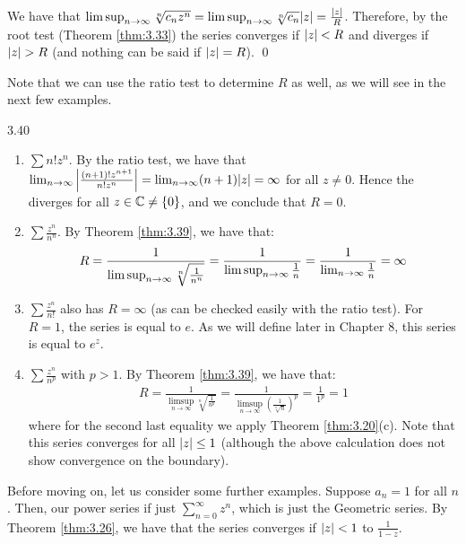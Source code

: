 \begin{nproof}
    We have that $\limsup_{n \rightarrow \infty} \sqrt[n]{c_n z^n} = \limsup_{n \rightarrow \infty} \sqrt[n]{c_n} \abs{z} = \frac{\abs{z}}{R}$. Therefore, by the root test (Theorem \ref{thm:3.33}) the series converges if $\abs{z} < R$ and diverges if $\abs{z} > R$ (and nothing can be said if $\abs{z} = R$). \qed
\end{nproof}
\noindent Note that we can use the ratio test to determine $R$ as well, as we will see in the next few examples.

\begin{example}{}{3.40}
    \begin{enumerate}
        \item $\sum n! z^n$. By the ratio test, we have that $\lim_{n \rightarrow \infty} \abs{\frac{(n+1)!z^{n+1}}{n!z^n}} = \lim_{n \rightarrow \infty} (n+1)\abs{z} = \infty$ for all $z \neq 0$. Hence the diverges for all $z \in \mathbb{C} \neq \set{0}$, and we conclude that $R = 0$. 
        \item $\sum \frac{z^n}{n^n}$. By Theorem \ref{thm:3.39}, we have that:
        \begin{align*}
            R = \frac{1}{\limsup_{n \rightarrow \infty}\sqrt[n]{\frac{1}{n^n}}} = \frac{1}{\limsup_{n \rightarrow \infty} \frac{1}{n}} = \frac{1}{\lim_{n \rightarrow \infty} \frac{1}{n}} = \infty
        \end{align*}
        \item $\sum \frac{z^n}{n!}$ also has $R = \infty$ (as can be checked easily with the ratio test). For $R = 1$, the series is equal to $e$. As we will define later in Chapter 8, this series is equal to $e^z$. 
        \item $\sum \frac{z^n}{n^p}$ with $p > 1$. By Theorem \ref{thm:3.39}, we have that:
        \begin{align*}
            R = \frac{1}{\limsup_{n \rightarrow \infty}\sqrt[n]{\frac{1}{n^p}}} = \frac{1}{\limsup_{n \rightarrow \infty} \left(\frac{1}{\sqrt[n]{n}}\right)^p} = \frac{1}{1^p} = 1
        \end{align*}
        where for the second last equality we apply Theorem \ref{thm:3.20}(c). Note that this series converges for all $\abs{z} \leq 1$ (although the above calculation does not show convergence on the boundary).
    \end{enumerate}
\end{example}
\noindent Before moving on, let us consider some further examples. Suppose $a_n = 1$ for all $n$. Then, our power series if just $\sum_{n=0}^\infty z^n$, which is just the Geometric series. By Theorem \ref{thm:3.26}, we have that the series converges if $\abs{z} < 1$ to $\frac{1}{1-z}$.
